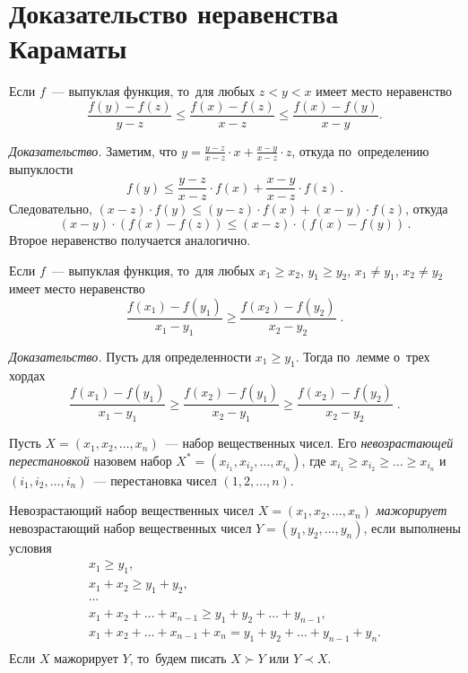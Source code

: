 
\section*{Доказательство неравенства Караматы}


Если $f$~--- выпуклая функция, то~для любых $z < y < x$ имеет место неравенство
\[
    \frac{f(y) - f(z)}{y - z}
\leq
    \frac{f(x) - f(z)}{x - z}
\leq
    \frac{f(x) - f(y)}{x - y}.
\] 

\textit{Доказательство.}
Заметим, что %
\(
    y = \frac{y - z}{x - z} \cdot x + \frac{x - y}{x - z} \cdot z
\),
откуда по~определению выпуклости
\[
    f(y)
\leq
    \frac{y - z}{x - z} \cdot f(x) + \frac{x - y}{x - z} \cdot f(z)
\,.\]
Следовательно,
$(x - z) \cdot f(y) \leq (y - z) \cdot f(x) + (x - y) \cdot f(z)$,
откуда
\[
    (x - y) \cdot (f(x) - f(z))
\leq
    (x - z) \cdot (f(x) - f(y))
\,.\]
Второе неравенство получается аналогично.

Если $f$~--- выпуклая функция, то~для любых
$x_1 \geq x_2$, $y_1 \geq y_2$, $x_1 \neq y_1$, $x_2 \neq y_2$ имеет место
неравенство
\[
    \frac{f(x_1) - f(y_1)}{x_1 - y_1}
\geq
    \frac{f(x_2) - f(y_2)}{x_2 - y_2}
\;.\]

\textit{Доказательство.}
Пусть для определенности $x_1 \geq y_1$.
Тогда по~лемме о~трех хордах
\[
    \frac{f(x_1) - f(y_1)}{x_1 - y_1}
\geq
    \frac{f(x_2) - f(y_1)}{x_2 - y_1}
\geq
    \frac{f(x_2) - f(y_2)}{x_2 - y_2}
\;.\]

Пусть $X = (x_1, x_2, \ldots, x_n)$~--- набор вещественных чисел.
Его \emph{невозрастающей перестановкой} назовем набор
$X^* = (x_{i_1}, x_{i_2}, \ldots, x_{i_n})$, где
$x_{i_1} \geq x_{i_2} \geq \ldots \geq x_{i_n}$
и~$(i_1, i_2, \ldots, i_n)$~--- перестановка чисел $(1, 2, \ldots, n)$.

Невозрастающий набор вещественных чисел $X = (x_1, x_2, \ldots, x_n)$
\emph{мажорирует}
невозрастающий набор вещественных чисел $Y = (y_1, y_2, \ldots, y_n)$,
если выполнены условия
\begin{gather*}
    x_1 \geq y_1
,\\
    x_1 + x_2 \geq y_1 + y_2
,\\ \cdots \\
    x_1 + x_2 + \ldots + x_{n-1} \geq y_1 + y_2 + \ldots + y_{n-1}
,\\
    x_1 + x_2 + \ldots + x_{n-1} + x_n = y_1 + y_2 + \ldots + y_{n-1} + y_n
.\\
\end{gather*}
Если $X$ мажорирует $Y$, то~будем писать $X \succ Y$ или $Y \prec X$.

